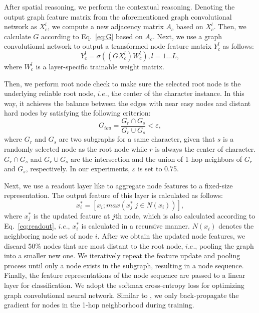\documentclass[letterpaper]{article} \usepackage{aaai22}  \usepackage{times}  \usepackage{helvet}  \usepackage{courier}  \usepackage[hyphens]{url}  \usepackage{graphicx} \urlstyle{rm} \def\UrlFont{\rm}  \usepackage{natbib}  \usepackage{caption} \DeclareCaptionStyle{ruled}{labelfont=normalfont,labelsep=colon,strut=off} \frenchspacing  \setlength{\pdfpagewidth}{8.5in}  \setlength{\pdfpageheight}{11in}
\begin{document}
After spatial reasoning, we perform the contextual reasoning. Denoting the output graph feature matrix from the aforementioned graph convolutional network as $X_c^l$, we compute a new adjacency matrix $A_{c}$ based on $X_c^l$. Then, we calculate $G$ according to Eq.~\eqref{eq:G} based on $A_{c}$. Next, we use a graph convolutional network to output a transformed node feature matrix $Y_c^l$ as follows:
\begin{equation}
	Y_{c}^l = \sigma ((GX_{c}^{l})W_c^{l}), l=1...L,
\end{equation}
where $W_c^{l}$ is a layer-specific trainable weight matrix.


Then, we perform root node check to make sure the selected root node is the underlying reliable root node, $i.e.$, the center of the character instance. In this way, it achieves the balance between the edges with near easy nodes and distant hard nodes by satisfying the following criterion:
\begin{equation}
	G_{iou}=\frac{G_{r}\cap G_{s}}{G_{r}\cup G_{s}} < \varepsilon,
\end{equation}
where $G_{r} $ and $G_{s} $ are two subgraphs for a same character, given that $s$ is a randomly selected node as the root node while $r$ is always the center of character. $G_{r}\cap G_{s}$ and $G_{r}\cup G_{s}$ are the intersection and the union of 1-hop neighbors of $G_{r} $ and $G_{s}$, respectively. In our experiments, $\varepsilon$ is set to 0.75.




Next, we use a readout layer like \cite{Lee2019SelfAttentionGP} to aggregate node features to a fixed-size representation. The output feature of this layer is calculated as follows:
\begin{equation}
	x_i^{*} = [x_{i};max({x_{j}^{*}|j\in N(x_i)})],
	\label{eq:readout}
\end{equation}
where $x_{j}^{*}$ is the updated feature at $j$th node, which is also calculated according to Eq.~\eqref{eq:readout}, $i.e.$, $x_i^{*}$ is calculated in a recursive manner. $N(x_i)$ denotes the neighboring node set of node $i$. 
After we obtain the updated node features, we discard 50\% nodes that are most distant to the root node, $i.e.$, pooling the graph into a smaller new one. We iteratively repeat the feature update and pooling process until only a node exists in the subgraph, resulting in a node sequence. Finally, the feature representations of the node sequence are passed to a linear layer for classification. We adopt the softmax cross-entropy loss for optimizing graph convolutional neural network. Similar to \cite{wang2019linkage}, we only back-propagate the gradient for nodes in the 1-hop neighborhood during training.
\end{document}
